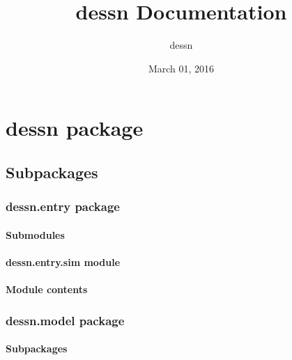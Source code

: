 \documentclass[letterpaper,10pt,english]{sphinxmanual}
\title{dessn Documentation}
\date{March 01, 2016}
\author{dessn}
\begin{document}
\maketitle
\tableofcontents
{}\label{modules::doc}



\chapter{dessn package}
\label{dessn:dessn}\label{dessn::doc}\label{dessn:dessn-package}

\section{Subpackages}
\label{dessn:subpackages}

\subsection{dessn.entry package}
\label{dessn.entry:dessn-entry-package}\label{dessn.entry::doc}

\subsubsection{Submodules}
\label{dessn.entry:submodules}

\subsubsection{dessn.entry.sim module}
\label{dessn.entry:dessn-entry-sim-module}\label{dessn.entry:module-dessn.entry.sim}

\subsubsection{Module contents}
\label{dessn.entry:module-dessn.entry}\label{dessn.entry:module-contents}

\subsection{dessn.model package}
\label{dessn.model:dessn-model-package}\label{dessn.model::doc}

\subsubsection{Subpackages}
\label{dessn.model:subpackages}
\end{document}
